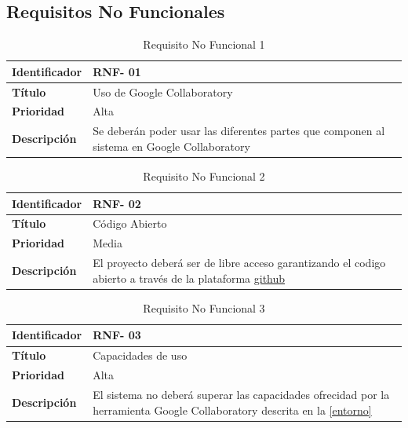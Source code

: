 \subsection {Requisitos No Funcionales}

\begin{table}[H] 
\begin{center}
\begin{tabular} {|P{4cm}|P{10cm}|}\hline
   {\bf Identificador} &{\bf RNF- 01}\\ \hline
  \textbf{Título}& Uso de Google Collaboratory\\ \hline
  \textbf{Prioridad}& Alta \\ \hline
  \textbf{Descripción}& Se deberán poder usar las diferentes partes que componen al sistema en Google Collaboratory \\ \hline
\end{tabular}
\end{center}
\vspace{-0.6cm}
\caption{Requisito No Funcional 1}
\end{table}


\begin{table}[H] 
\begin{center}
\begin{tabular} {|P{4cm}|P{10cm}|}\hline
   {\bf Identificador} &{\bf RNF- 02}\\ \hline
  \textbf{Título}& Código Abierto\\ \hline
  \textbf{Prioridad}&  Media\\ \hline
  \textbf{Descripción}& El proyecto deberá ser de libre acceso garantizando el codigo abierto a través de la plataforma \href{https://github.com/ValenUC3M/-NLP-BachelorThesis-GonzaloValenti}{github}\\ \hline
\end{tabular}
\end{center}
\vspace{-0.6cm}
\caption{Requisito No Funcional 2}
\end{table}

\begin{table}[H] 
\begin{center}
\begin{tabular} {|P{4cm}|P{10cm}|}\hline
   {\bf Identificador} &{\bf RNF- 03}\\ \hline
  \textbf{Título}& Capacidades de uso\\ \hline
  \textbf{Prioridad}&  Alta\\ \hline
  \textbf{Descripción}& El sistema no deberá superar las capacidades ofrecidad por la herramienta Google Collaboratory descrita en la \autoref{entorno}\\ \hline
\end{tabular}
\end{center}
\vspace{-0.6cm}
\caption{Requisito No Funcional 3}
\end{table}

